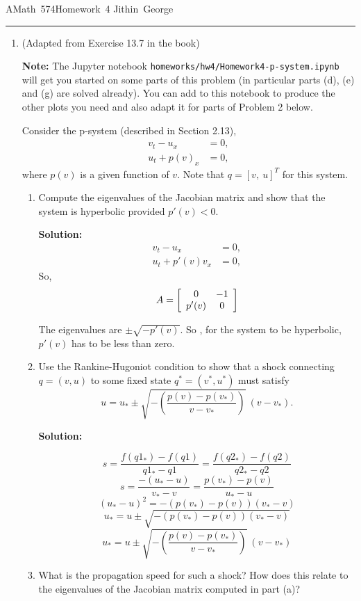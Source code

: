 \documentclass[11pt]{article}
\newenvironment{mat}{\left[ \begin{array}{ccccccccccccc}}{\end{array}\right]}
\newcommand\bcm{\begin{mat}}
\newcommand\ecm{\end{mat}}
\begin{document}
\hfill\vbox{\hbox{AMath 574}\hbox{Homework 4}
\hbox{Jithin George}}





\vskip 1cm
\hrule
\begin{enumerate} 
\item
(Adapted from Exercise 13.7 in the book)

{\bf Note:} The Jupyter notebook {\tt homeworks/hw4/Homework4-p-system.ipynb} 
will get you started on some parts of this problem (in particular parts (d),
(e) and (g) are solved already).  You can add
to this notebook to produce the other plots you need and also adapt it for
parts of Problem 2 below.

Consider the p-system (described in Section 2.13),
\begin{equation*}
\begin{split} 
v_t - u_x &= 0,\\
u_t + p(v)_x &= 0,
\end{split} 
\end{equation*}
where $p(v)$ is a given function of $v$.
Note that $q = [v,~u]^T$ for this system.
\begin{enumerate} 
\item Compute the eigenvalues of the Jacobian matrix and show that the
system is hyperbolic provided $p'(v)<0$.

\vskip 1cm
{\bf Solution:}
\begin{equation*}
\begin{split} 
v_t - u_x &= 0,\\
u_t + p'(v) v_x &= 0,
\end{split} 
\end{equation*}
So, 
\[ A= \bcm 0 & -1 \\ p'(v) & 0 \ecm \]

The eigenvalues are $\pm \sqrt{-p'(v)}$. So , for the system to be hyperbolic, $p'(v)$ has to be less than zero.

\item Use the Rankine-Hugoniot condition to show that a shock connecting
$q=(v,u)$ to some fixed state $q^*=(v^*,u^*)$ must satisfy
\begin{equation} 
u = u_* \pm \sqrt{-\left( \frac{p(v)-p(v_*)}{v-v_*} \right)} ~(v-v_*).
\end{equation}

\vskip 1cm
{\bf Solution:}

\[ s= \frac{f(q1_*)-f(q1)}{q1_*-q1}=\frac{f(q2_*)-f(q2)}{q2_*-q2}\]
\[ s= \frac{-(u_*-u)}{v_*-v}=\frac{p(v_*)-p(v)}{u_*-u}\]
\[ (u_*-u)^2=-(p(v_*)-p(v))(v_*-v)\]
\[ u_*=u \pm \sqrt{-(p(v_*)-p(v))(v_*-v)}\]
\[u_* = u \pm \sqrt{-\left( \frac{p(v)-p(v_*)}{v-v_*} \right)} ~(v-v_*)\]
\item What is the propagation speed for such a shock?  How does this relate
to the eigenvalues of the Jacobian matrix computed in part (a)?


\end{enumerate}
\end{enumerate}
\end{document}
